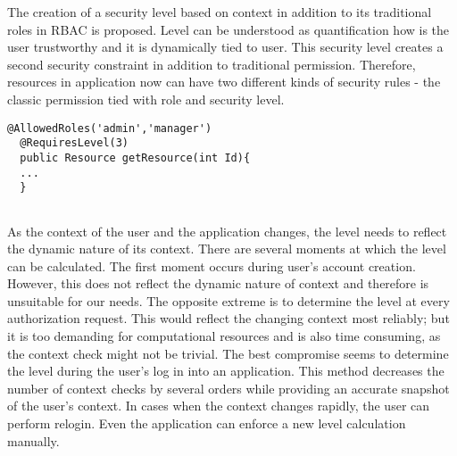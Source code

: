 \documentclass{sig-alternate-05-2015}
\begin{document}
The creation of a security level based on context in addition to its traditional roles in RBAC is proposed. Level can be understood as quantification how is the user trustworthy and it is dynamically tied to user. This security level creates a second security constraint in addition to traditional permission.  Therefore, resources in application now can have two different kinds of security rules - the classic permission tied with role and security level.



 
\begin{lstlisting}[]
  @AllowedRoles('admin','manager')
  @RequiresLevel(3)
  public Resource getResource(int Id){
  ...
  }
                
\end{lstlisting}

As the context of the user and the application changes, the level needs to reflect the dynamic nature of its context. There are several moments at which the level can be calculated. The first moment occurs during user's account creation. However, this does not reflect the dynamic nature of context and therefore is unsuitable for our needs. The opposite extreme is to determine the level at every authorization request. This would reflect the changing context most reliably; but it is too demanding for computational resources and is also time consuming, as the context check might not be trivial. The best compromise seems to determine the level during the user's log in into an application. This method decreases the number of context checks by several orders while providing an accurate snapshot of the user's context. In cases when the context changes rapidly, the user can perform relogin. Even the application can enforce a new level calculation manually.
\end{document}
